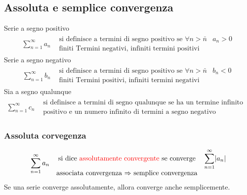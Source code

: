 \documentclass{book}
\newcommand{\abs}[1]{\lvert#1\rvert}
\begin{document}
\subsection{Assoluta e semplice convergenza}
Serie a segno positivo
\begin{equation*}
	\begin{matrix}
		\displaystyle\sum_{n=1}^{\infty} a_n& \begin{matrix}
			\text{si definisce a termini di segno positivo se } \forall n>
			\bar{n} &a_n>0\\
			\text{finiti Termini negativi, infiniti termini positivi}
		\end{matrix}
	\end{matrix}
\end{equation*}
Serie a segno negativo
\begin{equation*}
	\begin{matrix}
		\displaystyle\sum_{n=1}^{\infty} b_n& \begin{matrix}
			\text{si definisce a termini di segno positivo se } \forall n>
			\bar{n} &b_n<0\\
			\text{finiti Termini positivi, infiniti termini negativi}
		\end{matrix}
	\end{matrix}
\end{equation*}
Sia a segno qualunque
\begin{equation*}
	\begin{matrix}
		\displaystyle\sum_{n=1}^{\infty} c_n& \begin{matrix}
			\text{si definisce a termini di segno qualunque se ha un termine
			infinito di termini a segno}\\
			\text{positivo e un numero infinito di termini a segno negativo}
		\end{matrix}
	\end{matrix}
\end{equation*}
\subsubsection{Assoluta corvegenza}
\begin{equation*}
	\begin{matrix}
		\displaystyle\sum_{n=1}^{\infty} a_n& \begin{matrix}
			\text{si dice {\color{red}assolutamente convergente} se converge} &
			\displaystyle\sum_{n=1}^{\infty} \abs{a_n}\\
			\text{associata convergenza $\Rightarrow$ semplice convergenza} 
		\end{matrix}
	\end{matrix}
\end{equation*}
Se una serie converge assolutamente, allora converge anche semplicemente.

\printindex
\end{document}
